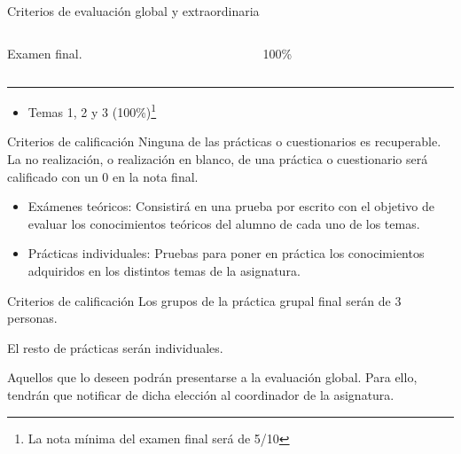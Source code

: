\begin{frame}{Criterios de evaluación global y extraordinaria}
\begin{columns}[T]
\begin{column}{.49\textwidth}
\vfill
Examen final.
\vfill
\end{column}

\begin{column}{.49\textwidth}
\centering
\vfill
\alert{\Huge 100\%}
\vfill
\end{column}
\end{columns}
\vfill
\hrule
\vfill

\begin{itemize}
    \item Temas 1, 2 y 3 (\alert{100\%})\footnote{La \alert{nota mínima} del examen final será de \alert{5/10}}
\end{itemize}
\vfill

\end{frame}

\begin{frame}{Criterios de calificación}
Ninguna de las prácticas o cuestionarios es recuperable. \alert{La no realización, o realización en blanco, de una práctica o cuestionario será calificado con un 0 en la nota final}.
\begin{itemize}
    \item \alert{Exámenes teóricos}: Consistirá en una prueba por escrito con el objetivo de evaluar los conocimientos teóricos del alumno de cada uno de los temas.
    \item \alert{Prácticas individuales}: Pruebas para poner en práctica los conocimientos adquiridos en los distintos temas de la asignatura.
\end{itemize}
\end{frame}

\begin{frame}{Criterios de calificación}
Los grupos de la \alert{práctica grupal} final serán de \alert{3 personas}.

El \alert{resto} de prácticas serán \alert{individuales}.

Aquellos que lo deseen podrán presentarse a la \alert{evaluación global}. Para ello, tendrán que notificar de dicha elección al coordinador de la asignatura.
\end{frame}

